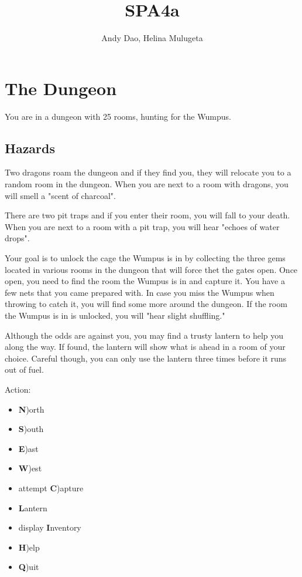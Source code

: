 \documentclass{formalLabReport} %
\title{SPA4a}
\author{Andy Dao, Helina Mulugeta}
\begin{document}
\maketitle

\section{The Dungeon}

You are in a dungeon with 25 rooms, hunting for the Wumpus. 

\subsection{Hazards}
Two dragons roam the dungeon and if they find you, they will relocate you to a random room in the dungeon. When you are next to a room with dragons, you will smell a "scent of charcoal".

There are two pit traps and if you enter their room, you will fall to your death. When you are next to a room with a pit trap, you will hear "echoes of water drops".

Your goal is to unlock the cage the Wumpus is in by collecting the three gems located in various rooms in the dungeon that will force thet the gates open. Once open, you need to find the room the Wumpus is in and capture it. You have a few nets that you came prepared with. In case you miss the Wumpus when throwing to catch it, you will find some more around the dungeon. If the room the Wumpus is in is unlocked, you will  "hear slight shuffling."

Although the odds are against you, you may find a trusty lantern to help you along the way. If found, the lantern will show what is ahead in a room of your choice. Careful though, you can only use the lantern three times before it runs out of fuel.

Action: 
\begin{itemize}
    \item \textbf{N})orth
    \item \textbf{S})outh
    \item \textbf{E})ast
    \item \textbf{W})est
    \item attempt \textbf{C})apture
    \item \textbf{L}antern
    \item display \textbf{I}nventory
    \item \textbf{H})elp
    \item \textbf{Q})uit
\end{itemize}
\end{document}

